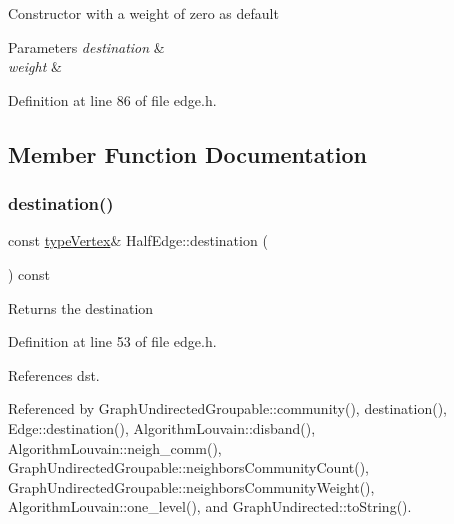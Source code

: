 Constructor with a weight of zero as default 
\begin{DoxyParams}{Parameters}
{\em destination} & \\
\hline
{\em weight} & \\
\hline
\end{DoxyParams}


Definition at line 86 of file edge.\+h.



\subsection{Member Function Documentation}
\mbox{\label{classHalfEdge_a98c0fb1c54506abbd3c0ac4a1264dac1}} 
\subsubsection{\texorpdfstring{destination()}{destination()}\hspace{0.1cm}{\footnotesize\ttfamily [1/2]}}
{\footnotesize\ttfamily const \hyperlink{edge_8h_a5fbd20c46956d479cb10afc9855223f6}{type\+Vertex}\& Half\+Edge\+::destination (\begin{DoxyParamCaption}{ }\end{DoxyParamCaption}) const\hspace{0.3cm}{\ttfamily [inline]}}

\begin{DoxyReturn}{Returns}
the destination 
\end{DoxyReturn}


Definition at line 53 of file edge.\+h.



References dst.



Referenced by Graph\+Undirected\+Groupable\+::community(), destination(), Edge\+::destination(), Algorithm\+Louvain\+::disband(), Algorithm\+Louvain\+::neigh\+\_\+comm(), Graph\+Undirected\+Groupable\+::neighbors\+Community\+Count(), Graph\+Undirected\+Groupable\+::neighbors\+Community\+Weight(), Algorithm\+Louvain\+::one\+\_\+level(), and Graph\+Undirected\+::to\+String().

\mbox{\label{classHalfEdge_ac9f0f75077407355bde248e083d98161}} 
